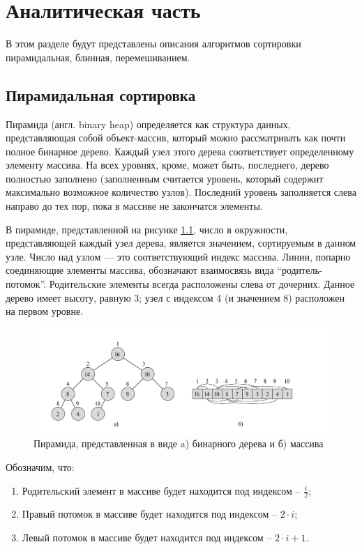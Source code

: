 \chapter{Аналитическая часть}

В этом разделе будут представлены описания алгоритмов сортировки пирамидальная,
блинная, перемешиванием.

\section{Пирамидальная сортировка}

Пирамида (англ. binary heap) 
определяется как структура данных, представляющая собой объект-массив, который
можно рассматривать как почти полное бинарное дерево. Каждый узел этого дерева соответствует определенному элементу массива. На всех уровнях, кроме, может быть, последнего, дерево полностью заполнено (заполненным считается уровень, который содержит максимально возможное количество узлов). Последний уровень заполняется слева направо до тех пор, пока в массиве не закончатся элементы.\cite{book_sort_algorithms}

В пирамиде, представленной на рисунке \ref{fig:heap_structs}, число в окружности, представляющей каждый узел дерева, является значением, сортируемым в данном узле. Число над узлом — это соответствующий индекс массива. Линии, попарно соединяющие элементы массива, обозначают взаимосвязь вида “родитель-потомок”. Родительские элементы всегда расположены слева от дочерних. Данное дерево имеет высоту, равную 3; узел с индексом 4 (и значением 8) расположен на первом уровне.

\begin{figure}[h]
	\centering
	\includegraphics[height=0.25\textheight]{img/heap_structs.png}
	\caption{Пирамида, представленная в виде a) бинарного дерева и б) массива}
	\label{fig:heap_structs}
\end{figure}

Обозначим, что:
\begin{enumerate} 
	\item Родительский элемент в массиве будет находится под индексом -- $\frac{i}{2}$;
	\item Правый потомок в массиве будет находится под индексом -- $2 \cdot i$;
	\item Левый потомок в массиве будет находится под индексом -- $2 \cdot i + 1$.
\end{enumerate}

